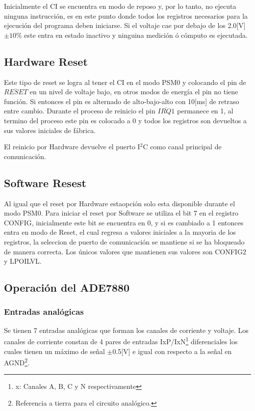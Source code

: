 \documentclass[letterpaper,12pt,oneside]{book}
\begin{document}
			Inicialmente el CI se encuentra en modo de reposo y, por lo tanto, no ejecuta ninguna instrucción, es en este punto donde todos los registros necesarios para la ejecución del programa deben iniciarse. Si el voltaje cae por debajo de los 2.0[V]$\pm10\%$ este entra en estado inactivo y ninguina medición ó cómputo es ejecutada.

			\subsection{Hardware Reset}
			Este tipo de reset se logra al tener el CI en el modo PSM0 y colocando el pin de $\overline{RESET}$ en un nivel de voltaje bajo, en otros modos de energía el pin no tiene función. Si entonces el pin es alternado de alto-bajo-alto con 10[ms] de retraso entre cambio. Durante el proceso de reinicio el pin $\overline{IRQ1}$ permanece en 1, al termino del proceso este pin es colocado a 0 y todos los registros son devueltos a sus valores iniciales de fábrica. 

			El reinicio por Hardware devuelve el puerto I$^2$C como canal principal de comunicación.

			\subsection{Software Resest}
			Al igual que el reset por Hardware estaopción solo esta disponible durante el modo PSM0. Para iniciar el reset por Software se utiliza el bit 7 en el registro CONFIG, inicialmente este bit se encuentra en 0, y si es cambiado a 1 entonces entra en modo de Reset, el cual regresa a valores iniciales a la mayoria de los registros, la seleccion de puerto de comunicación se mantiene si se ha bloqueado de manera correcta. Los únicos valores que mantienen sus valores son CONFIG2 y LPOILVL.

			\subsection{Operación del ADE7880}
				\subsubsection{Entradas analógicas}
				Se tienen 7 entradas analógicas que forman los canales de corriente y voltaje. Los canales de corriente constan de 4 pares de entradas IxP/IxN\footnote{x: Canales A, B, C y N respectivamente} diferenciales los cuales tienen un máximo de señal $\pm$0.5[V] e igual con respecto a la señal en AGND\footnote{Referencia a tierra para el circuito analógico.}.
\end{document}
